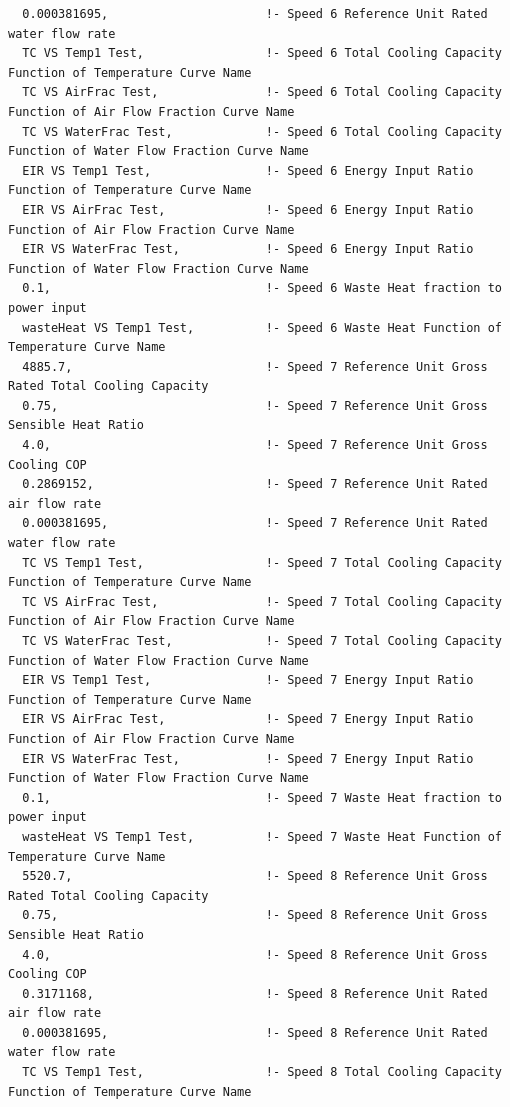 \begin{lstlisting}
  0.000381695,                      !- Speed 6 Reference Unit Rated water flow rate
  TC VS Temp1 Test,                 !- Speed 6 Total Cooling Capacity Function of Temperature Curve Name
  TC VS AirFrac Test,               !- Speed 6 Total Cooling Capacity Function of Air Flow Fraction Curve Name
  TC VS WaterFrac Test,             !- Speed 6 Total Cooling Capacity Function of Water Flow Fraction Curve Name
  EIR VS Temp1 Test,                !- Speed 6 Energy Input Ratio Function of Temperature Curve Name
  EIR VS AirFrac Test,              !- Speed 6 Energy Input Ratio Function of Air Flow Fraction Curve Name
  EIR VS WaterFrac Test,            !- Speed 6 Energy Input Ratio Function of Water Flow Fraction Curve Name
  0.1,                              !- Speed 6 Waste Heat fraction to power input
  wasteHeat VS Temp1 Test,          !- Speed 6 Waste Heat Function of Temperature Curve Name
  4885.7,                           !- Speed 7 Reference Unit Gross Rated Total Cooling Capacity
  0.75,                             !- Speed 7 Reference Unit Gross Sensible Heat Ratio
  4.0,                              !- Speed 7 Reference Unit Gross Cooling COP
  0.2869152,                        !- Speed 7 Reference Unit Rated air flow rate
  0.000381695,                      !- Speed 7 Reference Unit Rated water flow rate
  TC VS Temp1 Test,                 !- Speed 7 Total Cooling Capacity Function of Temperature Curve Name
  TC VS AirFrac Test,               !- Speed 7 Total Cooling Capacity Function of Air Flow Fraction Curve Name
  TC VS WaterFrac Test,             !- Speed 7 Total Cooling Capacity Function of Water Flow Fraction Curve Name
  EIR VS Temp1 Test,                !- Speed 7 Energy Input Ratio Function of Temperature Curve Name
  EIR VS AirFrac Test,              !- Speed 7 Energy Input Ratio Function of Air Flow Fraction Curve Name
  EIR VS WaterFrac Test,            !- Speed 7 Energy Input Ratio Function of Water Flow Fraction Curve Name
  0.1,                              !- Speed 7 Waste Heat fraction to power input
  wasteHeat VS Temp1 Test,          !- Speed 7 Waste Heat Function of Temperature Curve Name
  5520.7,                           !- Speed 8 Reference Unit Gross Rated Total Cooling Capacity
  0.75,                             !- Speed 8 Reference Unit Gross Sensible Heat Ratio
  4.0,                              !- Speed 8 Reference Unit Gross Cooling COP
  0.3171168,                        !- Speed 8 Reference Unit Rated air flow rate
  0.000381695,                      !- Speed 8 Reference Unit Rated water flow rate
  TC VS Temp1 Test,                 !- Speed 8 Total Cooling Capacity Function of Temperature Curve Name

\end{lstlisting}
